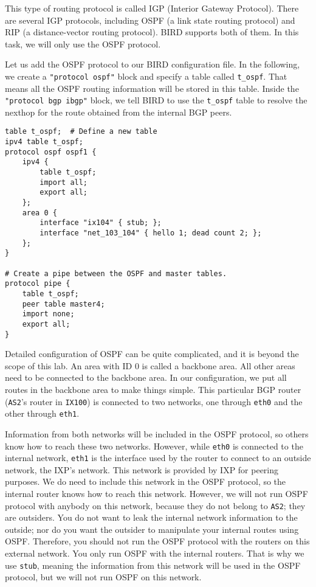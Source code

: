 This type of routing protocol is called IGP (Interior Gateway Protocol).
There are several IGP protocols, including OSPF (a link state routing protocol) and RIP (a
distance-vector routing protocol). BIRD supports both of them. In this
task, we will only use the OSPF protocol.

Let us add the OSPF protocol to our BIRD configuration file. In the following,
we create a \texttt{"protocol ospf"} block and specify a table called \texttt{t\_ospf}.
That means all the OSPF routing information will be stored in
this table. Inside the \texttt{"protocol bgp ibgp"} block, we tell BIRD to
use the \texttt{t\_ospf} table to resolve the nexthop for
the route obtained from the internal BGP peers.

\begin{lstlisting}
table t_ospf;  # Define a new table 
ipv4 table t_ospf;
protocol ospf ospf1 {
    ipv4 {
        table t_ospf;
        import all;
        export all;
    };
    area 0 {
        interface "ix104" { stub; };
        interface "net_103_104" { hello 1; dead count 2; };
    };
}

# Create a pipe between the OSPF and master tables. 
protocol pipe {
    table t_ospf;
    peer table master4;
    import none;
    export all;
}
\end{lstlisting}

Detailed configuration of OSPF can be quite complicated, and it is beyond the
scope of this lab.
An area with ID 0 is called a backbone area. All other areas need
to be connected to the backbone area. In our configuration, we put all routes
in the backbone area to make things simple. This
particular BGP router (\texttt{AS2}'s router in \texttt{IX100})
is connected to two networks, one through \texttt{eth0} and the other
through \texttt{eth1}.

Information from both networks will be included in the OSPF protocol,
so others know how to reach these two networks. However,
while \texttt{eth0} is connected to the internal network,
\texttt{eth1} is the interface used by the router
to connect to an outside network, the IXP's network. This network is provided
by IXP for peering purposes. We do need to include this network in the OSPF
protocol, so the internal router knows how to reach this network. However, we
will not run OSPF protocol with anybody on this network, because they
do not belong to \texttt{AS2}; they are outsiders.
You do not want to leak the internal network information to the outside;
nor do you want the outsider to manipulate your internal routes using OSPF.
Therefore, you should not run the OSPF protocol with
the routers on this external network.
You only run OSPF with the internal routers.
That is why we use \texttt{stub}, meaning the information from this network
will be used in the OSPF protocol, but we will not run OSPF on
this network.

